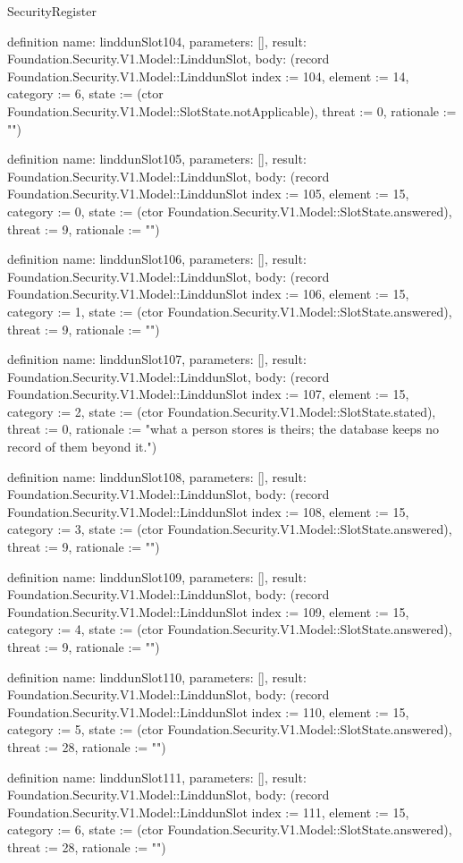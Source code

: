 \begin{lexlean}{SecurityRegister}
\begin{semanticmodule}
definition{
  name: linddunSlot104,
  parameters: [],
  result: Foundation.Security.V1.Model::LinddunSlot,
  body: (record Foundation.Security.V1.Model::LinddunSlot {index := 104, element := 14, category := 6, state := (ctor Foundation.Security.V1.Model::SlotState.notApplicable), threat := 0, rationale := ""})
}

definition{
  name: linddunSlot105,
  parameters: [],
  result: Foundation.Security.V1.Model::LinddunSlot,
  body: (record Foundation.Security.V1.Model::LinddunSlot {index := 105, element := 15, category := 0, state := (ctor Foundation.Security.V1.Model::SlotState.answered), threat := 9, rationale := ""})
}

definition{
  name: linddunSlot106,
  parameters: [],
  result: Foundation.Security.V1.Model::LinddunSlot,
  body: (record Foundation.Security.V1.Model::LinddunSlot {index := 106, element := 15, category := 1, state := (ctor Foundation.Security.V1.Model::SlotState.answered), threat := 9, rationale := ""})
}

definition{
  name: linddunSlot107,
  parameters: [],
  result: Foundation.Security.V1.Model::LinddunSlot,
  body: (record Foundation.Security.V1.Model::LinddunSlot {index := 107, element := 15, category := 2, state := (ctor Foundation.Security.V1.Model::SlotState.stated), threat := 0, rationale := "what a person stores is theirs; the database keeps no record of them beyond it."})
}

definition{
  name: linddunSlot108,
  parameters: [],
  result: Foundation.Security.V1.Model::LinddunSlot,
  body: (record Foundation.Security.V1.Model::LinddunSlot {index := 108, element := 15, category := 3, state := (ctor Foundation.Security.V1.Model::SlotState.answered), threat := 9, rationale := ""})
}

definition{
  name: linddunSlot109,
  parameters: [],
  result: Foundation.Security.V1.Model::LinddunSlot,
  body: (record Foundation.Security.V1.Model::LinddunSlot {index := 109, element := 15, category := 4, state := (ctor Foundation.Security.V1.Model::SlotState.answered), threat := 9, rationale := ""})
}

definition{
  name: linddunSlot110,
  parameters: [],
  result: Foundation.Security.V1.Model::LinddunSlot,
  body: (record Foundation.Security.V1.Model::LinddunSlot {index := 110, element := 15, category := 5, state := (ctor Foundation.Security.V1.Model::SlotState.answered), threat := 28, rationale := ""})
}

definition{
  name: linddunSlot111,
  parameters: [],
  result: Foundation.Security.V1.Model::LinddunSlot,
  body: (record Foundation.Security.V1.Model::LinddunSlot {index := 111, element := 15, category := 6, state := (ctor Foundation.Security.V1.Model::SlotState.answered), threat := 28, rationale := ""})
}


\end{semanticmodule}
\end{lexlean}
